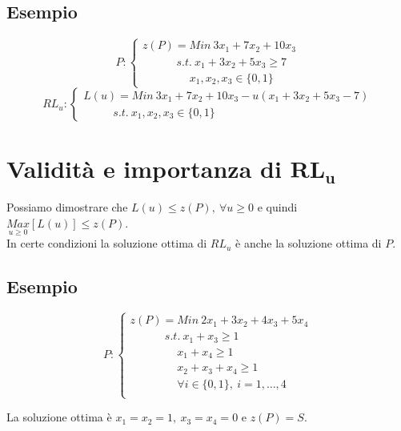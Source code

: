 \subsection{Esempio}
\begin{displaymath}
P:
\begin{cases}
z(P)=Min\ 3x_{1}+7x_{2}+10x_{3} \\
\ \ \ \ \ \ \ \ \ \ \ \ \ \,s.t.\ x_{1}+3x_{2}+5x_{3}\ge 7 \\
\ \ \ \ \ \ \ \ \ \ \ \ \ \ \ \ \ \ \ x_{1},x_{2},x_{3}\in\{0,1\}
\end{cases}
\end{displaymath}
\begin{displaymath}
RL_{u}:
\begin{cases}
L(u)=Min\ 3x_{1}+7x_{2}+10x_{3}-u(x_{1}+3x_{2}+5x_{3}-7) \\
\ \ \ \ \ \ \ \ \ \ \ \ s.t.\ x_{1},x_{2},x_{3}\in\{0,1\}
\end{cases}
\end{displaymath}

\section{Validità e importanza di $\boldsymbol{RL_{u}}$}
Possiamo dimostrare che $L(u)\le z(P),\ \forall u\ge0$ e quindi $\underset{u\ge 0}{Max}[L(u)]\le z(P)$.\\
In certe condizioni la soluzione ottima di $RL_{u}$ è anche la soluzione ottima di $P$.
\subsection{Esempio}
\begin{displaymath}
P:
\begin{cases}
z(P)=Min\ 2x_{1}+3x_{2}+4x_{3}+5x_{4} \\
\ \ \ \ \ \ \ \ \ \ \ \ \ \ s.t.\ x_{1}+x_{3}\ge 1 \\
\ \ \ \ \ \ \ \ \ \ \ \ \ \ \ \ \ \ \ x_{1}+x_{4}\ge 1 \\
\ \ \ \ \ \ \ \ \ \ \ \ \ \ \ \ \ \ \ x_{2}+x_{3}+x_{4}\ge 1 \\
\ \ \ \ \ \ \ \ \ \ \ \ \ \ \ \ \ \ \ \forall i \in \{0,1\},\ i=1,\dots,4 \\
\end{cases}
\end{displaymath}

La soluzione ottima è $x_{1}=x_{2}=1,\ x_{3}=x_{4}=0$ e $z(P)=S$.

